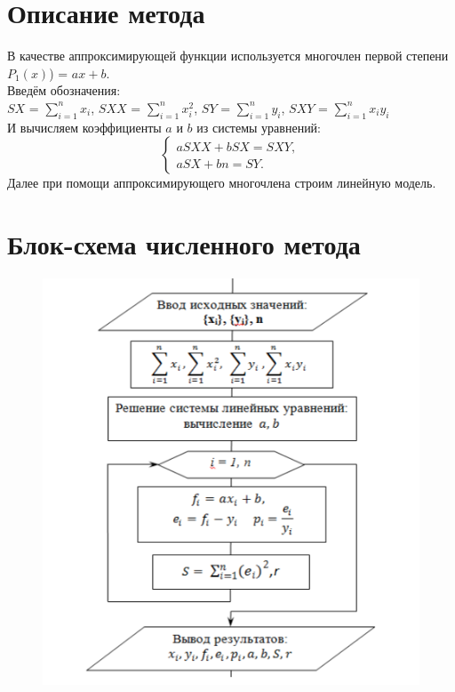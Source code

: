 \tableofcontents

\newpage


\section{Описание метода}
В качестве аппроксимирующей функции используется многочлен первой степени $P_{1}(x)$) = $ax + b$.\\
Введём обозначения:\\
$SX$ = $\sum_{i=1}^{n}x_{i}$, $SXX$ = $\sum_{i=1}^{n}x_{i}^{2}$, $SY$ = $\sum_{i=1}^{n}y_{i}$, $SXY$ = $\sum_{i=1}^{n}x_{i}y_{i}$\\
И вычисляем коэффициенты $a$ и $b$ из системы уравнений:
\begin{equation*}
 \begin{cases}
   aSXX + bSX = SXY,
   \\
   aSX + bn = SY.
 \end{cases}
\end{equation*}
Далее при помощи аппроксимирующего многочлена строим линейную модель.

\section{Блок-схема численного метода}
\begin{figure}[H]
    \centering
    \includegraphics[scale=0.5]{img/block-scheme}
\end{figure}

